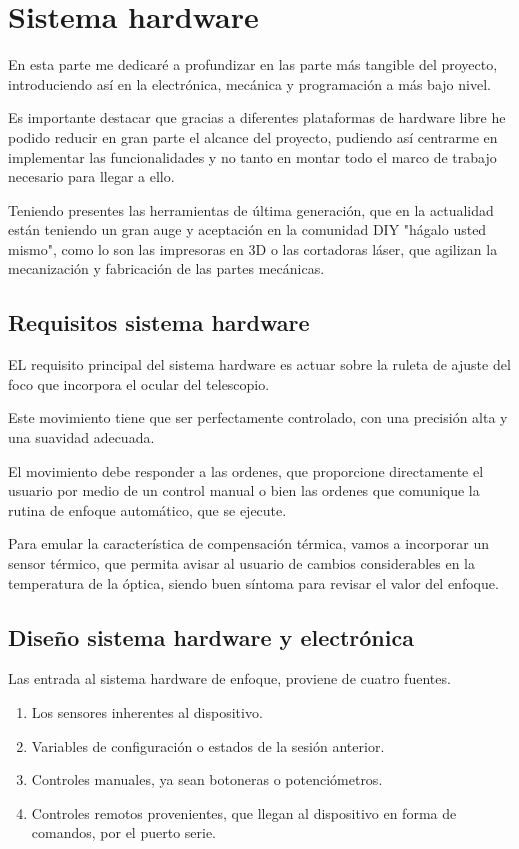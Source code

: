 \chapter{Sistema hardware}

\bigskip
En esta parte me dedicaré a profundizar en las parte más tangible del proyecto, introduciendo así en la electrónica, 
mecánica y programación a más bajo nivel.

\bigskip
Es importante destacar que gracias a diferentes plataformas de hardware libre he podido reducir en gran parte el alcance del proyecto, pudiendo así centrarme en implementar las funcionalidades y no tanto en montar todo el marco de trabajo 
necesario para llegar a ello. 

\bigskip
Teniendo presentes las  herramientas de última generación, que en la actualidad están teniendo un gran auge y aceptación 
en la comunidad DIY \cite{DIY} "hágalo usted mismo", como lo son las impresoras en 3D o las cortadoras láser, que agilizan la mecanización y fabricación de las partes mecánicas.


\section{Requisitos sistema hardware}

EL requisito principal del sistema hardware es actuar sobre la ruleta de ajuste del foco que incorpora el ocular del telescopio. 

Este movimiento tiene que ser perfectamente controlado, con una precisión alta y una suavidad adecuada. 

El movimiento debe responder a las ordenes, que proporcione directamente el usuario por medio de un control manual o bien las ordenes que comunique la rutina de enfoque automático, que se ejecute. 

Para emular la característica de compensación térmica, vamos a incorporar  un sensor térmico, que permita avisar al usuario de cambios considerables en la temperatura de la óptica, siendo buen síntoma para revisar el valor del enfoque.  


 

\section{Diseño sistema hardware y electrónica}


Las entrada al sistema hardware de enfoque, proviene de cuatro fuentes.

\begin{enumerate}
\item Los sensores inherentes al dispositivo.
\item Variables de configuración o estados de la sesión anterior. 
\item Controles manuales, ya sean botoneras o potenciómetros.
\item Controles remotos provenientes, que llegan al dispositivo en forma de comandos, por el puerto serie.
\end{enumerate}

